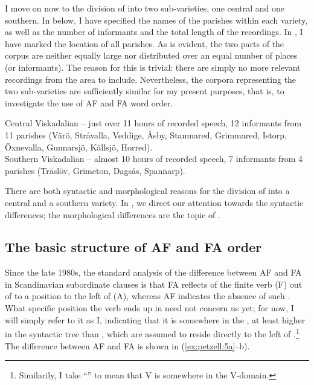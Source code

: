 \documentclass[output=paper,colorlinks,citecolor=brown,draft,draftmode]{langscibook}
\begin{document}
I move on now to the division of  into two sub-varieties, one central and one southern. In  below, I have specified the names of the parishes within each variety, as well as the number of informants and the total length of the recordings. In , I have marked the location of all parishes. As is evident, the two parts of the corpus are neither equally large nor distributed over an equal number of places (or informants). The reason for this is trivial: there are simply no more relevant recordings from the area to include. Nevertheless, the corpora representing the two sub-varieties are sufficiently similar for my present purposes, that is, to investigate the use of AF and FA word order.


\ea\label{ex:petzell:4}
\ea  {}Central Viskadalian – just over 11 hours of recorded speech, 12 informants from 11 parishes (Värö, Stråvalla, Veddige, Åsby, Stamnared, Grimmared, Istorp, Öxnevalla, Gunnarsjö, Källsjö, Horred).  \\
\ex\label{ex:petzell:4b}  Southern Viskadalian – almost 10 hours of recorded speech, 7 informants from 4 parishes (Träslöv, Grimeton, Dagsås, Spannarp).
\z
\z


There are both syntactic and morphological reasons for the division of  into a central and a southern variety. In , we direct our attention towards the syntactic differences; the morphological differences are the topic of .


\subsection{The basic structure of AF and FA order}\label{sec:petzell:2.2}


Since the late 1980s, the standard analysis of the difference between AF and FA in Scandinavian subordinate clauses is that FA reflects  of the finite verb (F) out of  to a position to the left of  (A), whereas AF indicates the absence of such . What specific position the verb ends up in need not concern us yet; for now, I will simply refer to it as I, indicating that it is somewhere in the , at least higher in the syntactic tree than , which are assumed to reside directly to the left of .\footnote{Similarily, I take “” to mean that V is somewhere in the V-domain.} The difference between AF and FA is shown in (\ref{ex:petzell:5a}–b).
\end{document}
